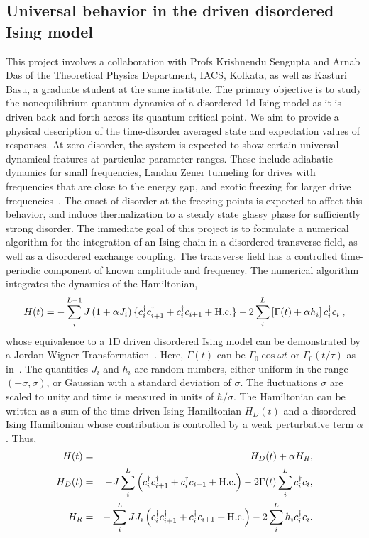 \documentclass[a4paper,10pt]{report}
\begin{document}
\subsection{Universal behavior in the driven disordered Ising model}
This project involves a collaboration with Profs Krishnendu Sengupta and Arnab Das of the Theoretical Physics Department, IACS, Kolkata, as well as Kasturi Basu, a graduate student at the same institute. The primary objective is to study the nonequilibrium quantum dynamics of a disordered 1d Ising model as it is driven back and forth across its quantum critical point. We aim to provide a physical description of the time-disorder averaged state and expectation values of responses. At zero disorder, the system is expected to show certain universal dynamical features at particular parameter ranges. These include adiabatic dynamics for small frequencies, Landau Zener tunneling for drives with frequencies that are close to the energy gap, and exotic freezing for larger drive frequencies~\cite{arnab1}. The onset of disorder at the freezing points is expected to affect this behavior, and induce thermalization to a steady state glassy phase for sufficiently strong disorder. The immediate goal of this project is to formulate a numerical algorithm for the integration of an Ising chain in a disordered transverse field, as well as a disordered exchange coupling. The transverse field has a controlled time-periodic component of known amplitude and frequency. The numerical algorithm integrates the dynamics of the Hamiltonian,
\begin{equation} \label{H_OBC}
H(t) = - \sum_i^{L-1} J\left(1+\alpha J_i\right) \{c^{\dagger}_i c^{\dagger}_{i+1} + c^{\dagger}_i c_{i+1}  + {\rm H.c.}\} 
    - 2 \sum_i^{L} \left[\Gamma(t)+\alpha h_i\right] c^{\dagger}_i c_i \;,
\end{equation}
whose equivalence to a 1D driven disordered Ising model can be demonstrated by a Jordan-Wigner Transformation~\cite{isingrand}.
Here, $\Gamma(t)$ can be $\Gamma_0\cos{\omega t}$ or $\Gamma_0 \left(t/\tau\right)$ as in~\cite{isingrand}. The quantities $J_i$ and $h_i$ are random numbers, either uniform in the range $(-\sigma,\sigma)$, or Gaussian with a standard deviation of $\sigma$. The fluctuations $\sigma$ are scaled to unity and time is measured  in units of $\hbar/\sigma$. The Hamiltonian can be written as a sum of the time-driven Ising Hamiltonian $ H_D(t)$ and a disordered Ising Hamiltonian whose contribution is controlled by a weak perturbative term $\alpha$. Thus,
\begin{eqnarray}
H(t)&=& H_D(t)+\alpha H_R,\nonumber \\
H_D(t) &=& -J\sum_i^{L} \left(c^{\dagger}_i c^{\dagger}_{i+1} + c^{\dagger}_i c_{i+1}  + {\rm H.c.}\right) - 2 \Gamma(t)\sum_i^{L}c^{\dagger}_i c_i,\nonumber \\
H_R &=& -\sum_i^{L} J J_i \left(c^{\dagger}_i c^{\dagger}_{i+1} + c^{\dagger}_i c_{i+1}  + {\rm H.c.}\right) - 2 \sum_i^{L}h_i c^{\dagger}_i c_i.
\end{eqnarray}
\end{document}
